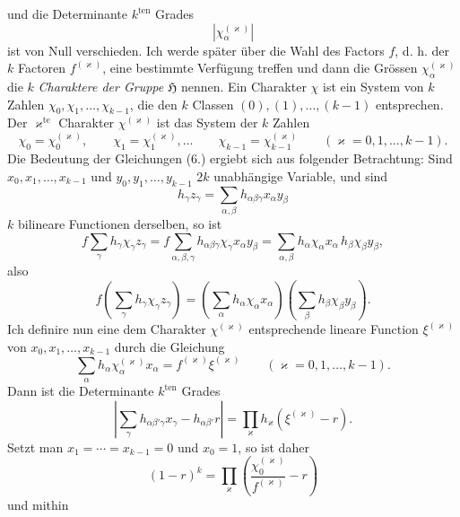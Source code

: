 \documentclass[11pt]{article}
\newcommand{\grp}{\mathfrak{H}}
\begin{document}
und die Determinante $k^{\text{ten}}$ Grades
\begin{equation*}\tag{8.}
\left|\chi_\alpha^{(\varkappa)}\right|
\end{equation*}
ist von Null verschieden. Ich werde später über die Wahl des Factors $f$, d. h. der $k$ Factoren $f^{(\varkappa)}$, eine bestimmte Verfügung treffen und dann die Grössen $\chi_\alpha^{(\varkappa)}$ die $k$ \emph{Charaktere der Gruppe $\grp$} nennen. Ein Charakter $\chi$ ist ein System von $k$ Zahlen $\chi_0,\chi_1,\ldots,\chi_{k-1}$, die den $k$ Classen $(0),(1),\ldots,(k-1)$ entsprechen. Der $\varkappa^{\text{te}}$ Charakter $\chi^{(\varkappa)}$ ist das System der $k$ Zahlen
\[
\chi_0=\chi_0^{(\varkappa)},\qquad \chi_1=\chi_1^{(\varkappa)},\ldots\qquad \chi_{k-1}=\chi_{k-1}^{(\varkappa)}\qquad(\varkappa=0,1,\ldots,k-1).
\]
Die Bedeutung der Gleichungen (6.) ergiebt sich aus folgender Betrachtung: Sind $x_0,x_1,\ldots,x_{k-1}$ und $y_0,y_1,\ldots,y_{k-1}$ $2k$ unabhängige Variable, und sind
\begin{equation*}\tag{9.}
h_\gamma z_\gamma=\sum_{\alpha,\beta}h_{\alpha\beta\gamma}x_\alpha y_\beta
\end{equation*}
$k$ bilineare Functionen derselben, so ist
\[
f\sum_\gamma h_\gamma\chi_\gamma z_\gamma
=f\sum_{\alpha,\beta,\gamma}h_{\alpha\beta\gamma}\chi_\gamma x_\alpha y_\beta
=\sum_{\alpha,\beta}h_\alpha\chi_\alpha x_\alpha\,h_\beta\chi_\beta y_\beta,
\]
also
\begin{equation*}\tag{10.}
f\left(\sum_\gamma h_\gamma\chi_\gamma z_\gamma\right)=
\left(\sum_\alpha h_\alpha\chi_\alpha x_\alpha\right)
\left(\sum_\beta h_\beta\chi_\beta y_\beta\right).
\end{equation*}
Ich definire nun eine dem Charakter $\chi^{(\varkappa)}$ entsprechende lineare Function $\xi^{(\varkappa)}$ von $x_0,x_1,\ldots,x_{k-1}$ durch die Gleichung
\begin{equation*}\tag{11.}
\sum_\alpha h_\alpha\chi_\alpha^{(\varkappa)}x_\alpha=f^{(\varkappa)}\xi^{(\varkappa)}\qquad(\varkappa=0,1,\ldots,k-1).
\end{equation*}
Dann ist die Determinante $k^{\text{ten}}$ Grades
\begin{equation*}\tag{12.}
\left|\sum_\gamma h_{\alpha\beta'\gamma}x_\gamma-h_{\alpha\beta'}r\right|=
\prod_\varkappa h_\varkappa\left(\xi^{(\varkappa)}-r\right).
\end{equation*}
Setzt man $x_1=\cdots=x_{k-1}=0$ und $x_0=1$, so ist daher
\[
(1-r)^k=\prod_\varkappa\left(\frac{\chi_0^{(\varkappa)}}{f^{(\varkappa)}}-r\right)
\]
und mithin
\end{document}
